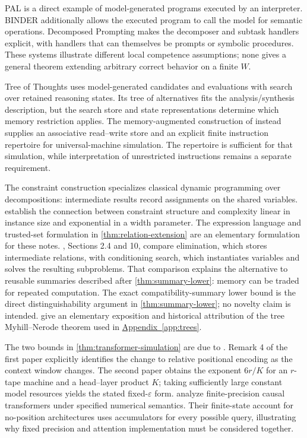 \documentclass[11pt,twoside]{article}
\newcommand{\appendixref}[1]{\hyperref[#1]{Appendix~\ref*{#1}}}
\theoremstyle{definition}
\theoremstyle{remark}
\begin{document}
PAL \citep{gao2023} is a direct example of model-generated programs executed
by an interpreter. BINDER \citep{cheng2023} additionally allows the executed
program to call the model for semantic operations. Decomposed Prompting
\citep{khot2023} makes the decomposer and subtask handlers explicit, with
handlers that can themselves be prompts or symbolic procedures. These
systems illustrate different local competence assumptions; none gives a
general theorem extending arbitrary correct behavior on a finite $W$.

Tree of Thoughts \citep{yao2023} uses model-generated candidates and
evaluations with search over retained reasoning states. Its tree of
alternatives fits the analysis/synthesis description, but the search store
and state representations determine which memory restriction applies.
The memory-augmented construction of \citet{schuurmans2023} instead supplies
an associative read--write store and an explicit finite instruction
repertoire for universal-machine simulation. The repertoire is sufficient
for that simulation, while interpretation of unrestricted instructions
remains a separate requirement.

The constraint construction specializes classical dynamic programming over
decompositions: intermediate results record assignments on the shared
variables. \citet{freuder1990} establish the connection between constraint
structure and complexity linear in instance size and exponential in a
width parameter. The expression language and trusted-set formulation in
\cref{thm:relation-extension} are an elementary formulation for these notes.
\citet{dechter1999}, Sections 2.4 and 10, compare elimination, which stores
intermediate relations, with conditioning search, which instantiates
variables and solves the resulting subproblems. That comparison explains
the alternative to reusable summaries described after
\cref{thm:summary-lower}: memory can be traded for repeated computation.
The exact compatibility-summary lower bound is the direct
distinguishability argument in \cref{thm:summary-lower}; no novelty claim
is intended. \citet{kozen1992} give an elementary exposition and historical
attribution of the tree Myhill--Nerode theorem used in
\appendixref{app:trees}.

The two bounds in \cref{thm:transformer-simulation} are due to
\citet{liwang2025a,liwang2025b}. Remark 4 of the first paper explicitly
identifies the change to relative positional encoding as the context
window changes. The second paper obtains the exponent $6r/K$ for an
$r$-tape machine and a head--layer product $K$; taking sufficiently large
constant model resources yields the stated fixed-$\varepsilon$ form.
\citet{nowak2026} analyze finite-precision causal transformers under
specified numerical semantics. Their finite-state account for no-position
architectures uses accumulators for every possible query, illustrating why
fixed precision and attention implementation must be considered together.
\end{document}
